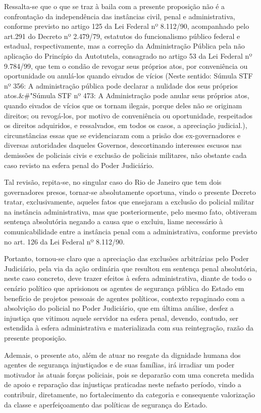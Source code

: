 \documentclass[10pt]{article}
\begin{document}
Ressalta-se que o que se traz à baila com a presente proposição não é a confrontação da independência das instâncias civil, penal e administrativa, conforme previsto no artigo 125 da Lei Federal nº 8.112/90, acompanhado pelo art.291 do Decreto nº 2.479/79, estatutos do funcionalismo público federal e estadual, respectivamente, mas a correção da Administração Pública pela não aplicação do Princípio da Autotutela, consagrado no artigo 53 da Lei Federal nº 9.784/99, que tem o condão de revogar seus próprios atos, por conveniência ou oportunidade ou anulá-los quando eivados de vícios (Neste sentido: Súmula STF nº 356: A administração pública pode declarar a nulidade dos seus próprios atos.&#"Súmula STF nº 473: A Administração pode anular seus próprios atos, quando eivados de vícios que os tornam ilegais, porque deles não se originam direitos; ou revogá-los, por motivo de conveniência ou oportunidade, respeitados os direitos adquiridos, e ressalvados, em todos os casos, a apreciação judicial.), circunstâncias essas que se evidenciaram com a prisão dos ex-governadores e diversas autoridades daqueles Governos, descortinando interesses escusos nas demissões de policiais civis e exclusão de policiais militares, não obstante cada caso revisto na esfera penal do Poder Judiciário.

Tal revisão, repita-se, no singular caso do Rio de Janeiro que tem dois governadores presos, tornar-se absolutamente oportuna, vindo o presente Decreto tratar, exclusivamente, aqueles fatos que ensejaram a exclusão do policial militar na instância administrativa, mas que posteriormente, pelo mesmo fato, obtiveram sentença absolutória negando a causa que o excluiu, liame necessário à comunicabilidade entre a instância penal com a administrativa, conforme previsto no art. 126 da Lei Federal nº 8.112/90. 

Portanto, tornou-se claro que a apreciação das exclusões arbitrárias pelo Poder Judiciário,  pela via da ação ordinária que resultou em sentença penal absolutória, neste caso concreto, deve trazer efeitos à esfera administrativa, diante de todo o cenário político que aprisionou os agentes de segurança pública do Estado em benefício de projetos pessoais de agentes políticos, contexto repaginado com a absolvição do policial no Poder Judiciário, que em última análise, desfez a injustiça que vitimou aquele servidor na esfera penal, devendo, contudo, ser estendida à esfera administrativa e materializada com sua reintegração, razão da presente proposição. 

Ademais, o presente ato, além de atuar no resgate da dignidade humana dos agentes de segurança injustiçados e de suas famílias, irá irradiar um poder motivador às atuais forças policiais, pois se depararão com uma concreta medida de apoio e reparação das injustiças praticadas neste nefasto período, vindo a contribuir, diretamente, no fortalecimento da categoria e consequente valorização da classe e aperfeiçoamento das políticas de segurança do Estado.
\end{document}
